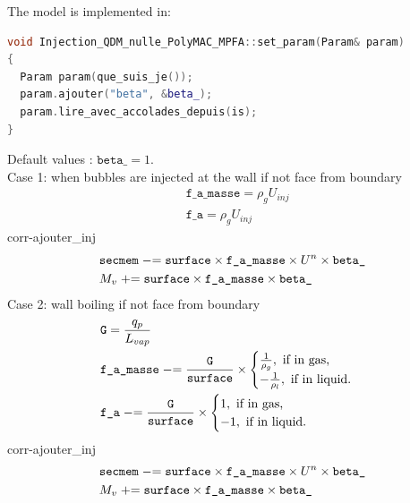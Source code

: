 The model is implemented in:
\begin{lstlisting}[language=c++]
void Injection_QDM_nulle_PolyMAC_MPFA::set_param(Param& param)
{
  Param param(que_suis_je());
  param.ajouter("beta", &beta_);
  param.lire_avec_accolades_depuis(is);
}
\end{lstlisting}
Default values : $\texttt{beta\_} =1$.\\
Case 1: when bubbles are injected at the wall if not face from boundary
\begin{align}
    &\texttt{f\_a\_masse}=\rho_g U_{inj}\\
    &\texttt{f\_a}=\rho_g U_{inj}
\end{align}
corr-ajouter\_inj
\begin{align}
  &\texttt{secmem} \mathrel{-}= \texttt{surface}\times \texttt{f\_a\_masse}\times U^n\times \texttt{beta\_}\\
  &M_v \mathrel{+}= \texttt{surface}\times \texttt{f\_a\_masse}\times \texttt{beta\_}
\end{align}
Case 2: wall boiling if not face from boundary
\begin{align}
&\texttt{G}=\frac{q_p}{L_{vap}}\\
&\texttt{f\_a\_masse}  \mathrel{-}= \frac{\texttt{G}}{\texttt{surface}}\times \begin{cases} \frac{1}{\rho_g},\text{ if in gas,}\\-\frac{1}{\rho_l},\text{ if in liquid.} \end{cases}\\
&\texttt{f\_a}  \mathrel{-}= \frac{\texttt{G}}{\texttt{surface}}\times \begin{cases} 1,\text{ if in gas,}\\-1,\text{ if in liquid.}\end{cases}
\end{align}
corr-ajouter\_inj
\begin{align}
  &\texttt{secmem}  \mathrel{-}=  \texttt{surface} \times \texttt{f\_a\_masse}\times U^n\times \texttt{beta\_}\\
  &M_v \mathrel{+}= \texttt{surface}\times \texttt{f\_a\_masse}\times \texttt{beta\_}
\end{align}

